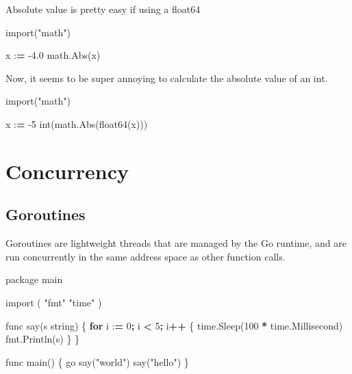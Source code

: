 \documentclass[]{book}
\newenvironment{Shaded}{\begin{snugshade}}{\end{snugshade}}
\newcommand{\BuiltInTok}[1]{#1}
\newcommand{\ControlFlowTok}[1]{\textcolor[rgb]{0.13,0.29,0.53}{\textbf{#1}}}
\newcommand{\DecValTok}[1]{\textcolor[rgb]{0.00,0.00,0.81}{#1}}
\newcommand{\FloatTok}[1]{\textcolor[rgb]{0.00,0.00,0.81}{#1}}
\newcommand{\ImportTok}[1]{#1}
\newcommand{\NormalTok}[1]{#1}
\newcommand{\OperatorTok}[1]{\textcolor[rgb]{0.81,0.36,0.00}{\textbf{#1}}}
\newcommand{\StringTok}[1]{\textcolor[rgb]{0.31,0.60,0.02}{#1}}
\begin{document}
Absolute value is pretty easy if using a float64

\begin{Shaded}
\begin{Highlighting}[]
\ImportTok{import}\NormalTok{(}\StringTok{"math"}\NormalTok{)}

\NormalTok{x :}\OperatorTok{=} \FloatTok{-4.0}
\NormalTok{math.Abs(x)}
\end{Highlighting}
\end{Shaded}

Now, it seems to be super annoying to calculate the absolute value of an int.

\begin{Shaded}
\begin{Highlighting}[]
\ImportTok{import}\NormalTok{(}\StringTok{"math"}\NormalTok{)}

\NormalTok{x :}\OperatorTok{=} \DecValTok{-5}
\BuiltInTok{int}\NormalTok{(math.Abs(float64(x)))}
\end{Highlighting}
\end{Shaded}

\hypertarget{concurrency}{%
\section{Concurrency}\label{concurrency}}

\hypertarget{goroutines}{%
\subsection{Goroutines}\label{goroutines}}

Goroutines are lightweight threads that are managed by the Go runtime, and are run concurrently in the same address space as other function calls.

\begin{Shaded}
\begin{Highlighting}[]
\NormalTok{package main}

\ImportTok{import}\NormalTok{ (}
    \StringTok{"fmt"}
    \StringTok{"time"}
\NormalTok{)}

\NormalTok{func say(s string) \{}
    \ControlFlowTok{for}\NormalTok{ i :}\OperatorTok{=} \DecValTok{0}\OperatorTok{;}\NormalTok{ i }\OperatorTok{<} \DecValTok{5}\OperatorTok{;}\NormalTok{ i}\OperatorTok{++}\NormalTok{ \{}
\NormalTok{        time.Sleep(}\DecValTok{100} \OperatorTok{*}\NormalTok{ time.Millisecond)}
\NormalTok{        fmt.Println(s)}
\NormalTok{    \}}
\NormalTok{\}}

\NormalTok{func main() \{}
\NormalTok{    go say(}\StringTok{"world"}\NormalTok{)}
\NormalTok{    say(}\StringTok{"hello"}\NormalTok{)}
\NormalTok{\}}
\end{Highlighting}
\end{Shaded}
\end{document}
